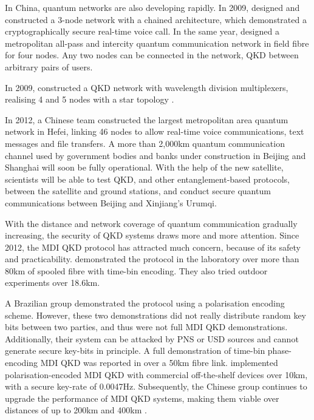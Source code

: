 \documentclass[aps, rmp, twocolumn, amsmath, amssymb, nofootinbib, superscriptaddress, longbibliography, floatfix, table-of-contents, eqsecnum]{revtex4-1}
\newcommand{\comment}[1]{{\color{blue}{\textbf{#1}}}}
\begin{document}
In China, quantum networks are also developing rapidly. In 2009, \cite{bib:OpEx17_6540} designed and constructed a 3-node network with a chained architecture, which demonstrated a cryptographically secure real-time voice call. In the same year, \cite{bib:OpEx_18_27217} designed a metropolitan all-pass and intercity quantum communication network in field fibre \comment{What�s field fibre???} for four nodes. Any two nodes can be connected in the network, QKD between arbitrary pairs of users.

In 2009, \cite{bib:PLA_372_3957} constructed a QKD network with wavelength division multiplexers, realising 4 and 5 nodes with a star topology \cite{bib:OL_35_2454}.

In 2012, a Chinese team constructed the largest metropolitan area quantum network in Hefei, linking 46 nodes to allow real-time voice communications, text messages and file transfers. A more than 2,000km quantum communication channel used by government bodies and banks under construction in Beijing and Shanghai will soon be fully operational. With the help of the new satellite, scientists will be able to test QKD, and other entanglement-based protocols, between the satellite and ground stations, and conduct secure quantum communications between Beijing and Xinjiang's Urumqi.

With the distance and network coverage of quantum communication gradually increasing, the security of QKD systems draws more and more attention. Since 2012, the MDI QKD protocol has attracted much concern, because of its safety and practicability. \cite{bib:PRL_111_130501} demonstrated the protocol in the laboratory over more than 80km of spooled fibre with time-bin encoding. They also tried outdoor experiments over 18.6km.

A Brazilian group \cite{bib:PRA_88_052303} demonstrated the protocol using a polarisation encoding scheme. However, these two demonstrations did not really distribute random key bits between two parties, and thus were not full MDI QKD demonstrations. Additionally, their system can be attacked by PNS or USD \comment{Define these acronyms!} sources and cannot generate secure key-bits in principle. A full demonstration of time-bin phase-encoding MDI QKD was reported in \cite{bib:PRL_111_130502} over a 50km fibre link. \cite{bib:PRL_112_190503} implemented polarisation-encoded MDI QKD with commercial off-the-shelf devices over 10km, with a secure key-rate of 0.0047Hz. Subsequently, the Chinese group continues to upgrade the performance of MDI QKD systems, making them viable over distances of up to 200km \cite{bib:PRL_113_190501} and 400km \cite{bib:arx160606821}.
\end{document}
